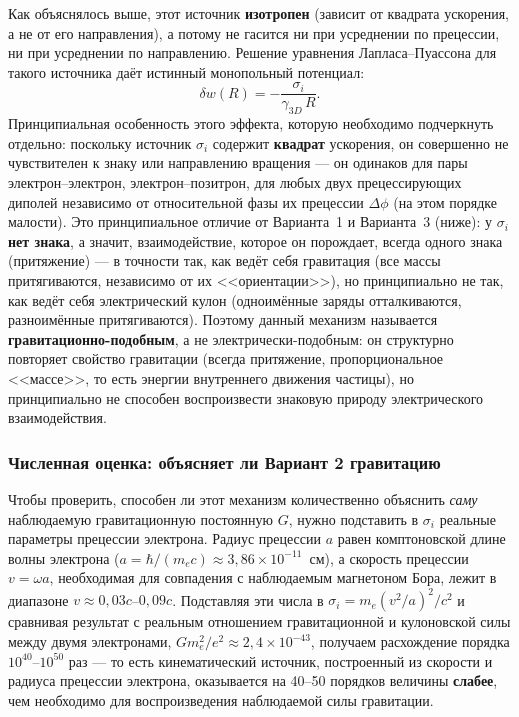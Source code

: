 \documentclass[12pt,a4paper]{article}
\begin{document}
Как объяснялось выше, этот источник \textbf{изотропен} (зависит от
квадрата ускорения, а не от его направления), а потому не гасится ни
при усреднении по прецессии, ни при усреднении по направлению.
Решение уравнения Лапласа--Пуассона для такого источника даёт
истинный монопольный потенциал:
\begin{equation}
\delta w(R) = -\frac{\sigma_i}{\gamma_{3D}\,R}.
\end{equation}
Принципиальная особенность этого эффекта, которую необходимо
подчеркнуть отдельно: поскольку источник $\sigma_i$ содержит
\textbf{квадрат} ускорения, он совершенно не чувствителен к знаку или
направлению вращения --- он одинаков для пары электрон--электрон,
электрон--позитрон, для любых двух прецессирующих диполей независимо
от относительной фазы их прецессии $\Delta\phi$ (на этом порядке
малости). Это принципиальное отличие от Варианта~1 и Варианта~3
(ниже): у $\sigma_i$ \textbf{нет знака}, а значит, взаимодействие,
которое он порождает, всегда одного знака (притяжение) --- в точности
так, как ведёт себя гравитация (все массы притягиваются, независимо
от их <<ориентации>>), но принципиально не так, как ведёт себя
электрический кулон (одноимённые заряды отталкиваются, разноимённые
притягиваются). Поэтому данный механизм называется
\textbf{гравитационно-подобным}, а не электрически-подобным: он
структурно повторяет свойство гравитации (всегда притяжение,
пропорциональное <<массе>>, то есть энергии внутреннего движения
частицы), но принципиально не способен воспроизвести знаковую природу
электрического взаимодействия.

\subsubsection{Численная оценка: объясняет ли Вариант 2 гравитацию}

Чтобы проверить, способен ли этот механизм количественно объяснить
\emph{саму} наблюдаемую гравитационную постоянную $G$, нужно
подставить в $\sigma_i$ реальные параметры прецессии электрона.
Радиус прецессии $a$ равен комптоновской длине волны электрона
($a=\hbar/(m_ec)\approx3{,}86\times10^{-11}$~см), а скорость прецессии
$v=\omega a$, необходимая для совпадения с наблюдаемым магнетоном
Бора, лежит в диапазоне $v\approx0{,}03c$--$0{,}09c$. Подставляя эти
числа в $\sigma_i=m_e(v^2/a)^2/c^2$ и сравнивая результат с реальным
отношением гравитационной и кулоновской силы между двумя электронами,
$Gm_e^2/e^2\approx2{,}4\times10^{-43}$, получаем расхождение порядка
$10^{40}$--$10^{50}$ раз --- то есть кинематический источник,
построенный из скорости и радиуса прецессии электрона, оказывается на
40--50 порядков величины \textbf{слабее}, чем необходимо для
воспроизведения наблюдаемой силы гравитации.
\end{document}
